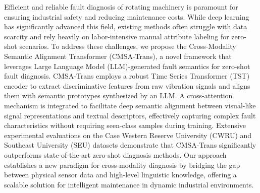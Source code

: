 Efficient and reliable fault diagnosis of rotating machinery is paramount for ensuring industrial safety and reducing maintenance costs. While deep learning has significantly advanced this field, existing methods often struggle with data scarcity and rely heavily on labor-intensive manual attribute labeling for zero-shot scenarios. To address these challenges, we propose the Cross-Modality Semantic Alignment Transformer (CMSA-Trans), a novel framework that leverages Large Language Model (LLM)-generated fault semantics for zero-shot fault diagnosis. CMSA-Trans employs a robust Time Series Transformer (TST) encoder to extract discriminative features from raw vibration signals and aligns them with semantic prototypes synthesized by an LLM. A cross-attention mechanism is integrated to facilitate deep semantic alignment between visual-like signal representations and textual descriptors, effectively capturing complex fault characteristics without requiring seen-class samples during training. Extensive experimental evaluations on the Case Western Reserve University (CWRU) and Southeast University (SEU) datasets demonstrate that CMSA-Trans significantly outperforms state-of-the-art zero-shot diagnosis methods. Our approach establishes a new paradigm for cross-modality diagnosis by bridging the gap between physical sensor data and high-level linguistic knowledge, offering a scalable solution for intelligent maintenance in dynamic industrial environments.
